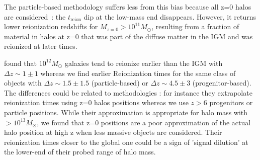 \documentclass[twocolumn]{aastex61}
\begin{document}
The particle-based methodology suffers less from this bias because all z=0 halos are considered~: the $t_\mathrm{reion}$ dip at the low-mass end disappears. However, it returns lower reionization redshifts for $M_{z=0}>10^{11} M_\odot$, resulting from  a fraction of material in halos at z=0 that was part of the diffuse matter in the IGM and was reionized at later times.

\citet{LI14} found  that $10^{12} M_\odot$ galaxies tend to reionize earlier than the IGM with $\Delta z\sim 1\pm1$ whereas we find earlier Reionization times for the same class of objects with $\Delta z\sim 1.5\pm 1.5$ (particle-based) or $\Delta z\sim 4.5\pm 3$ (progenitor-based). The differences could be related to methodologies : for instance they extrapolate reionization times using z=0 halos positions whereas we use $z>6$ progenitors or particle positions. While their approximation is appropriate for halo mass with $>10^{13} M_\odot$, we found that z=0 positions are a poor approximation of the actual halo position at high z when less massive objects are considered. Their reionization times closer to the global one could be a sign of 'signal dilution' at the lower-end of their probed range of halo mass. 
\end{document}
